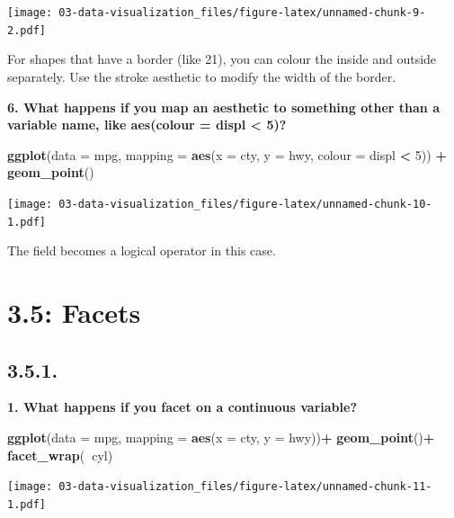 \documentclass[]{book}
\newenvironment{Shaded}{\begin{snugshade}}{\end{snugshade}}
\newcommand{\DataTypeTok}[1]{\textcolor[rgb]{0.13,0.29,0.53}{#1}}
\newcommand{\DecValTok}[1]{\textcolor[rgb]{0.00,0.00,0.81}{#1}}
\newcommand{\KeywordTok}[1]{\textcolor[rgb]{0.13,0.29,0.53}{\textbf{#1}}}
\newcommand{\NormalTok}[1]{#1}
\newcommand{\OperatorTok}[1]{\textcolor[rgb]{0.81,0.36,0.00}{\textbf{#1}}}
\newcommand{\StringTok}[1]{\textcolor[rgb]{0.31,0.60,0.02}{#1}}
\theoremstyle{definition}
\theoremstyle{definition}
\theoremstyle{definition}
\theoremstyle{remark}
\begin{document}
\texttt{[image: 03-data-visualization\_files/figure-latex/unnamed-chunk-9-2.pdf]}

For shapes that have a border (like 21), you can colour the inside and
outside separately. Use the stroke aesthetic to modify the width of the
border.

\textbf{6. What happens if you map an aesthetic to something other than
a variable name, like aes(colour = displ \textless{} 5)?}

\begin{Shaded}
\begin{Highlighting}[]
\KeywordTok{ggplot}\NormalTok{(}\DataTypeTok{data =}\NormalTok{ mpg, }\DataTypeTok{mapping =} \KeywordTok{aes}\NormalTok{(}\DataTypeTok{x =}\NormalTok{ cty, }\DataTypeTok{y =}\NormalTok{ hwy, }\DataTypeTok{colour =}\NormalTok{ displ }\OperatorTok{<}\StringTok{ }\DecValTok{5}\NormalTok{)) }\OperatorTok{+}
\StringTok{  }\KeywordTok{geom_point}\NormalTok{()}
\end{Highlighting}
\end{Shaded}

\texttt{[image: 03-data-visualization\_files/figure-latex/unnamed-chunk-10-1.pdf]}

The field becomes a logical operator in this case.

\hypertarget{facets}{%
\section{3.5: Facets}\label{facets}}

\hypertarget{section-2}{%
\subsection{3.5.1.}\label{section-2}}

\textbf{1. What happens if you facet on a continuous variable?}

\begin{Shaded}
\begin{Highlighting}[]
\KeywordTok{ggplot}\NormalTok{(}\DataTypeTok{data =}\NormalTok{ mpg, }\DataTypeTok{mapping =} \KeywordTok{aes}\NormalTok{(}\DataTypeTok{x =}\NormalTok{ cty, }\DataTypeTok{y =}\NormalTok{ hwy))}\OperatorTok{+}
\StringTok{  }\KeywordTok{geom_point}\NormalTok{()}\OperatorTok{+}
\StringTok{  }\KeywordTok{facet_wrap}\NormalTok{(}\OperatorTok{~}\NormalTok{cyl)}
\end{Highlighting}
\end{Shaded}

\texttt{[image: 03-data-visualization\_files/figure-latex/unnamed-chunk-11-1.pdf]}
\end{document}

